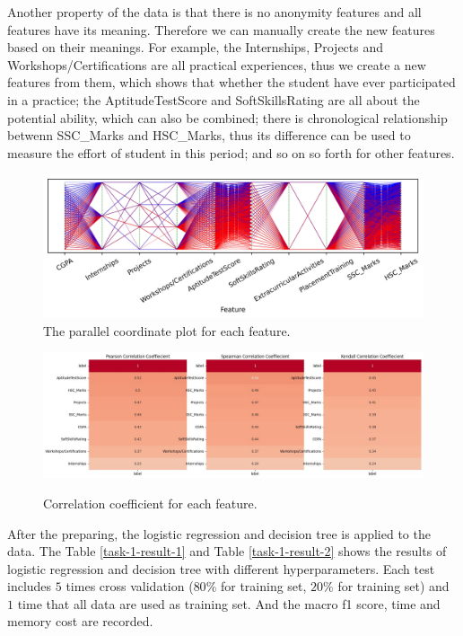 \documentclass[11pt]{article}
\begin{document}
Another property of the data is that there is no anonymity features and all features have its meaning. Therefore we can manually create the new features based on their meanings. For example, the Internships, Projects and Workshops/Certifications are all practical experiences, thus we create a new features from them, which shows that whether the student have ever participated in a practice; the AptitudeTestScore and SoftSkillsRating are all about the potential ability, which can also be combined; there is chronological relationship betwenn SSC\_Marks and HSC\_Marks, thus its difference can be used to measure the effort of student in this period; and so on so forth for other features.

\begin{figure}[H]
  \centering
  \includegraphics[width=\textwidth]{../code/Task1/Analysis/PC.jpg}
  \caption{The parallel coordinate plot for each feature.}
  \label{task-1-data-distribution}
\end{figure}

\begin{figure}[H]
  \centering
  \includegraphics[width=\textwidth]{../code/Task1/Analysis/corrcoef.jpg} \\
  \caption{Correlation coefficient for each feature.}
  \label{task-1-correlation-coefficient}
\end{figure}

After the preparing, the logistic regression and decision tree is applied to the data. The Table \ref{task-1-result-1} and Table \ref{task-1-result-2} shows the results of logistic regression and decision tree with different hyperparameters. Each test includes $5$ times cross validation ($80\%$ for training set, $20\%$ for training set) and $1$ time that all data are used as training set. And the macro f1 score, time and memory cost are recorded.
\end{document}
